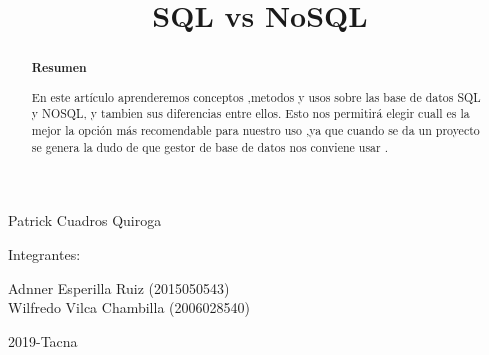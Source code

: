 \documentclass[%
 reprint,
 amsmath,amssymb,
 aps,
]{revtex4-1}
\begin{document}
\begin{titlepage}
\begin{center}
\vspace*{0.1in}
\begin{large}
 Patrick Cuadros Quiroga\\
\end{large}

\vspace*{0.2in}
\vspace*{0.1in}
\begin{large}
Integrantes: \\
\begin{flushleft}
Adnner Esperilla Ruiz		\hfill	(2015050543) \\
Wilfredo Vilca Chambilla		\hfill	(2006028540) \\

\vspace*{0.5in}
\begin{center}
2019-Tacna\\
\end{center}
\vspace*{2in}
\end{flushleft}
\end{large}
\end{center}

\end{titlepage}



\title{SQL vs NoSQL}


\begin{abstract}
\begin{center}
\vspace*{0.5in}
\textbf{Resumen}
\end{center}

En este artículo aprenderemos conceptos ,metodos y usos sobre las base de datos SQL y NOSQL, y tambien sus diferencias entre ellos. Esto nos permitirá elegir cuall es la mejor la opción más recomendable para nuestro uso ,ya que cuando se da un proyecto se genera la dudo de que gestor de base de datos nos conviene usar .\\


\begin{center}

\end{center}


\end{abstract}


\maketitle
\end{document}
